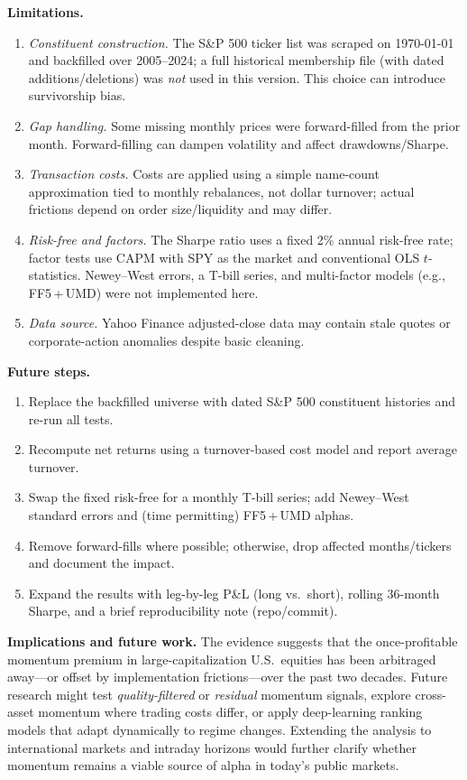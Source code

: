 \documentclass[11pt]{article}
\begin{document}
\textbf{Limitations.}
\begin{enumerate}[label=(\roman*), leftmargin=*]
  \item \textit{Constituent construction.} The S\&P 500 ticker list was scraped on \today{} and backfilled over 2005--2024; a full historical membership file (with dated additions/deletions) was \emph{not} used in this version. This choice can introduce survivorship bias.
  \item \textit{Gap handling.} Some missing monthly prices were forward-filled from the prior month. Forward-filling can dampen volatility and affect drawdowns/Sharpe.
  \item \textit{Transaction costs.} Costs are applied using a simple name-count approximation tied to monthly rebalances, not dollar turnover; actual frictions depend on order size/liquidity and may differ.
  \item \textit{Risk-free and factors.} The Sharpe ratio uses a fixed 2\% annual risk-free rate; factor tests use CAPM with SPY as the market and conventional OLS $t$-statistics. Newey--West errors, a T-bill series, and multi-factor models (e.g., FF5\,+\,UMD) were not implemented here.
  \item \textit{Data source.} Yahoo Finance adjusted-close data may contain stale quotes or corporate-action anomalies despite basic cleaning.
\end{enumerate}

\textbf{Future steps.}
\begin{enumerate}[label=(\alph*), leftmargin=*]
  \item Replace the backfilled universe with dated S\&P 500 constituent histories and re-run all tests.
  \item Recompute net returns using a turnover-based cost model and report average turnover.
  \item Swap the fixed risk-free for a monthly T-bill series; add Newey--West standard errors and (time permitting) FF5\,+\,UMD alphas.
  \item Remove forward-fills where possible; otherwise, drop affected months/tickers and document the impact.
  \item Expand the results with leg-by-leg P\&L (long vs.\ short), rolling 36-month Sharpe, and a brief reproducibility note (repo/commit).
\end{enumerate}

\textbf{Implications and future work.}  
The evidence suggests that the once-profitable momentum premium in large-capitalization U.S.\ equities has been arbitraged away—or offset by implementation frictions—over the past two decades.  
Future research might test \emph{quality-filtered} or \emph{residual} momentum signals, explore cross-asset momentum where trading costs differ, or apply deep-learning ranking models that adapt dynamically to regime changes.  
Extending the analysis to international markets and intraday horizons would further clarify whether momentum remains a viable source of alpha in today’s public markets.



\end{document}
